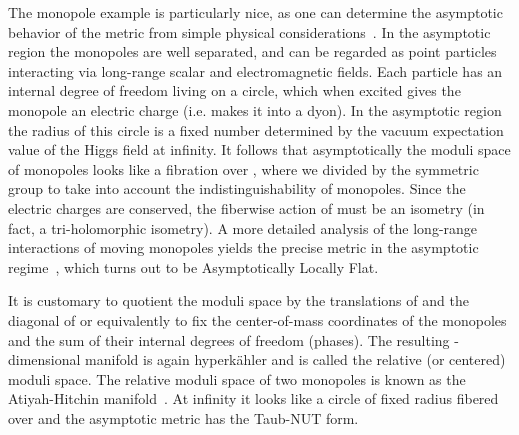 \documentclass[a4paper,12pt, amsfonts, amssymb]{article}
\providecommand{\RR}{{\mathbb R}}
\providecommand{\ZZ}{{\mathbb Z}}
\begin{document}
The monopole example is particularly nice, as one can determine the asymptotic
behavior of the metric from simple physical considerations~\cite{Mtn,GM}.
In the asymptotic region the monopoles are well separated, and can be regarded
as point particles interacting via long-range scalar and electromagnetic
fields. Each particle has an internal degree of freedom living on a circle,
which when excited gives the monopole an electric charge (i.e. makes it into
a dyon). In the asymptotic region the radius of this circle is a fixed
number determined by the vacuum expectation value of the Higgs field at
infinity. It follows that asymptotically the moduli space of \coordHE{}  \coordHE{}
monopoles looks like a \coordHE{} fibration over \myHighlight{$(\RR^3)^k/S_k$}\coordHE{}, where we divided
by the symmetric group \coordHE{} to take into account the indistinguishability
of monopoles. Since the electric charges are conserved, the
fiberwise action of \coordHE{} must be an isometry (in fact, a tri-holomorphic isometry).
A more detailed
analysis of the long-range interactions of moving monopoles yields
the precise metric in the asymptotic regime~\cite{Mtn,GM}, which turns out
to be Asymptotically Locally Flat.

It is customary to quotient the moduli
space by the translations of \myHighlight{$\RR^3$}\coordHE{} and the diagonal of \coordHE{} or equivalently to fix the center-of-mass coordinates of the monopoles
and the sum of their internal degrees of freedom (phases). The resulting \coordHE{}-dimensional manifold is again hyperk\"ahler and is called the
relative (or centered) moduli space. The relative moduli
space of two monopoles is known as the Atiyah-Hitchin manifold~\cite{AH}. At infinity it looks
like a circle of fixed radius fibered
over \myHighlight{$\RR^3/\ZZ_2,$}\coordHE{} and the asymptotic metric has the Taub-NUT form.
\end{document}

